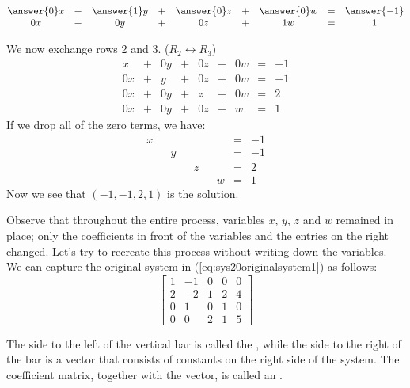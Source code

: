 \documentclass{ximera}
\begin{document}
\begin{exploration}
\begin{problem}
\begin{problem}
\begin{problem}
\begin{problem}
\begin{prompt}
$$\begin{matrix}
     \answer{0}x& +&\answer{1}y&+&\answer{0}z&+& \answer{0}w&=& \answer{-1}\\
     0x&+&0y&+&0z&+&1w&=&1
    \end{matrix}$$
\end{prompt}    
\end{problem}
\end{problem}
\end{problem}
\end{problem}
We now exchange rows 2 and 3. ($R_2\leftrightarrow R_3$)
\begin{equation}\label{eq:sys20rref1}
\begin{array}{ccccccccc}
      x &+ &0y&+&0z&+&0w&= &-1 \\
   0x& +&y&+&0z&+&0w&=&-1\\
   0x& +&0y&+&z&+&0w&=&2\\
     0x&+&0y&+&0z&+&w&=&1
    \end{array}
    \end{equation}
    If we drop all of the zero terms, we have:
    \begin{equation}\label{eq:sys20rrefnozeros}
    \begin{array}{ccccccccc}
      x & &&&&&&= &-1 \\
   & &y&&&&&=&-1\\
   & &&&z&&&=&2\\
     &&&&&&w&=&1
    \end{array}
    \end{equation}
Now we see that $(-1, -1, 2, 1)$ is the solution.

Observe that throughout the entire process, variables $x$, $y$, $z$ and $w$ remained in place; only the coefficients in front of the variables and the entries on the right changed.  Let's try to recreate this process without writing down the variables.  We can capture the original system in (\ref{eq:sys20originalsystem1}) as follows:
$$\left[\begin{array}{cccc|c}  
 1&-1&0&0&0\\2&-2&1&2&4\\0&1&0&1&0\\0&0&2&1&5
 \end{array}\right]$$
 
   The side to the left of the vertical bar is called the , while the side to the right of the bar is a vector that consists of constants on the right side of the system.  The coefficient matrix, together with the vector, is called an .
 

\end{exploration}
\end{document}
